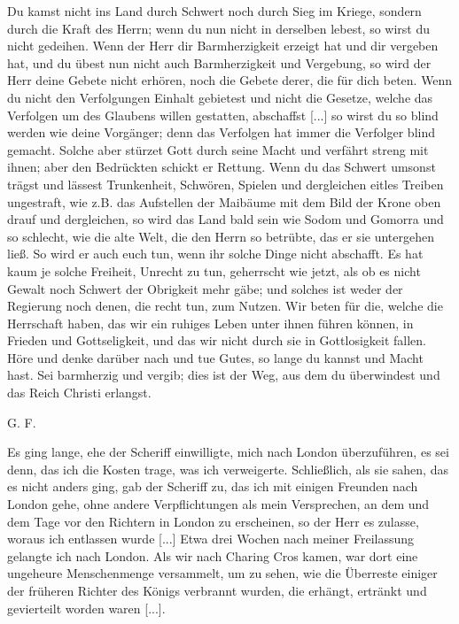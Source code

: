 Du kamst nicht ins Land durch Schwert noch durch Sieg im
Kriege, sondern durch die Kraft des Herrn; wenn du nun nicht
in derselben lebest, so wirst du nicht gedeihen. Wenn der Herr
dir Barmherzigkeit erzeigt hat und dir vergeben hat, und du
übest nun nicht auch Barmherzigkeit und Vergebung, so wird der
Herr deine Gebete nicht erhören, noch die Gebete derer, die für
dich beten. Wenn du nicht den Verfolgungen Einhalt gebietest
und nicht die Gesetze, welche das Verfolgen um des Glaubens
willen gestatten, abschaffst [...] so wirst du so blind werden
wie deine Vorgänger; denn das Verfolgen hat immer die Verfolger 
blind gemacht. Solche aber stürzet Gott durch seine Macht
und verfährt streng mit ihnen; aber den Bedrückten schickt er
Rettung. Wenn du das Schwert umsonst trägst und lässest
Trunkenheit, Schwören, Spielen und dergleichen eitles Treiben
ungestraft, wie z.B. das Aufstellen der Maibäume mit dem Bild
der Krone oben drauf und dergleichen, so wird das Land bald
sein wie Sodom und Gomorra und so schlecht, wie die alte Welt,
die den Herrn so betrübte, das er sie untergehen ließ. So wird
er auch euch tun, wenn ihr solche Dinge nicht abschafft. Es hat
kaum je solche Freiheit, Unrecht zu tun, geherrscht wie jetzt, als
ob es nicht Gewalt noch Schwert der Obrigkeit mehr gäbe; und
solches ist weder der Regierung noch denen, die recht tun, zum
Nutzen. Wir beten für die, welche die Herrschaft haben, das
wir ein ruhiges Leben unter ihnen führen können, in Frieden
und Gottseligkeit, und das wir nicht durch sie in Gottlosigkeit
fallen. Höre und denke darüber nach und tue Gutes, so lange
du kannst und Macht hast. Sei barmherzig und vergib; dies
ist der Weg, aus dem du überwindest und das Reich Christi
erlangst.\grqq
\begin{flushright}G. F.\end{flushright}

Es ging lange, ehe der Scheriff einwilligte, mich nach London
überzuführen, es sei denn, das ich die Kosten trage, was ich 
verweigerte. Schließlich, als sie sahen, das es nicht anders ging,
gab der Scheriff zu, das ich mit einigen Freunden nach London
gehe, ohne andere Verpflichtungen als mein Versprechen, an
dem und dem Tage vor den Richtern in London zu erscheinen,
so der Herr es zulasse, woraus ich entlassen wurde [...]
Etwa drei Wochen nach meiner Freilassung gelangte ich nach
London. Als wir nach Charing Cros kamen, war dort eine
ungeheure Menschenmenge versammelt, um zu sehen, wie die
Überreste einiger der früheren Richter des Königs verbrannt
wurden, die erhängt, ertränkt und gevierteilt worden waren [...].

